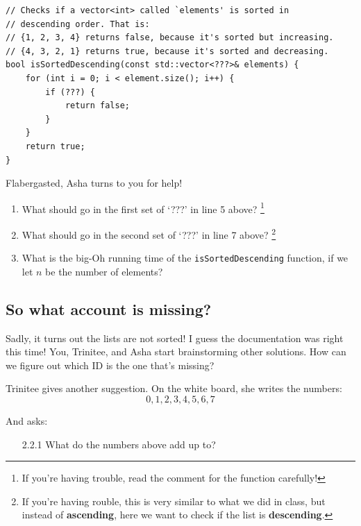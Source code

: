\documentclass [12pt]{article}
\begin{document}
\vspace{2em} 

\begin{verbatim}
// Checks if a vector<int> called `elements' is sorted in
// descending order. That is:
// {1, 2, 3, 4} returns false, because it's sorted but increasing.
// {4, 3, 2, 1} returns true, because it's sorted and decreasing.
bool isSortedDescending(const std::vector<???>& elements) {
    for (int i = 0; i < element.size(); i++) {
        if (???) {
            return false;
        }
    }
    return true;
}
\end{verbatim}

Flabergasted, Asha turns to you for help!

\begin{enumerate}
    \item {} What should go in the first set of `???' in line 5 above? \footnote{If you're having trouble, read the comment for the function carefully!}
    \item {} What should go in the second set of `???' in line 7 above? \footnote{If you're having rouble, this is very similar to what we did in class, but instead of \textbf{ascending}, here we want to check if the list is \textbf{descending}.}
    \item {} What is the big-Oh running time of the \texttt{isSortedDescending} function, if we let $n$ be the number of elements?
\end{enumerate}


\subsection{So what account is missing?}
 Sadly, it turns out the lists are not sorted! I guess the documentation was right this time! You, Trinitee, and Asha start brainstorming other solutions. How can we figure out which ID is the one that's missing?

Trinitee gives another suggestion. On the white board, she writes the numbers:
$$
0, 1, 2, 3, 4, 5, 6, 7
$$

And asks:

\begin{enumerate}
    \item [2.2.1]  What do the numbers above add up to? 
\end{enumerate}
\end{document}

